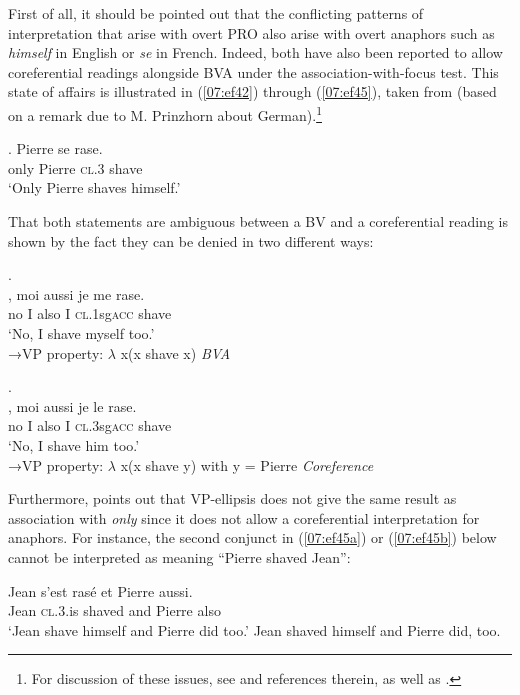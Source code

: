 \documentclass[output=paper,colorlinks,citecolor=brown,draft,draftmode]{langscibook}
\begin{document}
First of all, it should be pointed out that the conflicting patterns of interpretation that arise with overt PRO also arise with overt anaphors such as \textit{himself} in English or \textit{se} in French. Indeed, both have also been reported to allow coreferential readings alongside BVA under the association-with-focus test. This state of affairs is illustrated in (\ref{07:ef42}) through (\ref{07:ef45}), taken from \citet{sportiche14} (based on a remark due to M. Prinzhorn about German).\footnote{For discussion of these issues, see \citet{buring05} and references therein, as well as .}


\ea\label{07:ef42}
.
\ex
{} {Pierre} {se} {rase}.\\
only Pierre \textsc{cl.3} shave\\
\glt ‘Only Pierre shaves himself.’
\z
\z

That both statements are ambiguous between a BV and a coreferential reading is shown by the fact they can be denied in two different ways:

\ea\label{07:ef43}
.\\
\ex
{}, {moi} {aussi} {je} {me} {rase}. \\
no I also  I \textsc{cl}.1sg\textsc{acc} shave \\
\glt   ‘No, I shave myself too.’\\
    →VP property: $\lambda$ x(x shave x) \hfill  \textit{BVA}
\z
\z

\ea\label{07:ef44}
.\\
\ex
{}, {moi} {aussi} {je} {le}  {rase}. \\
no I also  I \textsc{cl}.3sg\textsc{acc} shave \\
\glt   ‘No, I shave him too.’\\
→VP property: $\lambda$ x(x shave y) with y = Pierre \hfill  \textit{Coreference}
\z
\z

Furthermore, \citet{sportiche14} points out that VP-ellipsis does not give the same result as association with \textit{only} since it does not allow a coreferential interpretation for anaphors. For instance, the second conjunct in (\ref{07:ef45a}) or (\ref{07:ef45b}) below cannot be interpreted as meaning “Pierre shaved Jean”:

\ea\label{07:ef45}
\ea\label{07:ef45a}{Jean} {s’est} {rasé} {et} {Pierre} {aussi}.\\
Jean \textsc{cl.3.}is shaved and Pierre also\\
\glt ‘Jean shave himself and Pierre did too.’
\ex\label{07:ef45b} {Jean shaved himself and Pierre did, too}.
\z
\z
\end{document}
